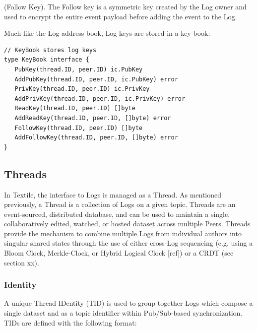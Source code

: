 \documentclass{comjnl}
\begin{document}
\begin{definition}
(Follow Key). The Follow key is a symmetric key created by the Log owner and used to encrypt the entire event payload before adding the event to the Log.
\end{definition}

Much like the Log address book, Log keys are stored in a key book:

\begin{lstlisting}
// KeyBook stores log keys
type KeyBook interface {
   PubKey(thread.ID, peer.ID) ic.PubKey
   AddPubKey(thread.ID, peer.ID, ic.PubKey) error
   PrivKey(thread.ID, peer.ID) ic.PrivKey
   AddPrivKey(thread.ID, peer.ID, ic.PrivKey) error
   ReadKey(thread.ID, peer.ID) []byte
   AddReadKey(thread.ID, peer.ID, []byte) error
   FollowKey(thread.ID, peer.ID) []byte
   AddFollowKey(thread.ID, peer.ID, []byte) error
}
\end{lstlisting}

\subsection{Threads}

In Textile, the interface to Logs is managed as a Thread. As mentioned previously, a Thread is a collection of Logs on a given topic. Threads are an event-sourced, distributed database, and can be used to maintain a single, collaboratively edited, watched, or hosted dataset across multiple Peers. Threads provide the mechanism to combine multiple Logs from individual authors into singular shared states through the use of either cross-Log sequencing (e.g. using a Bloom Clock, Merkle-Clock, or Hybrid Logical Clock [ref]) or a CRDT (see section xx).

\subsubsection{Identity}

A unique Thread IDentity (TID) is used to group together Logs which compose a single dataset and as a topic identifier within Pub/Sub-based synchronization. TIDs are defined with the following format:
\end{document}
